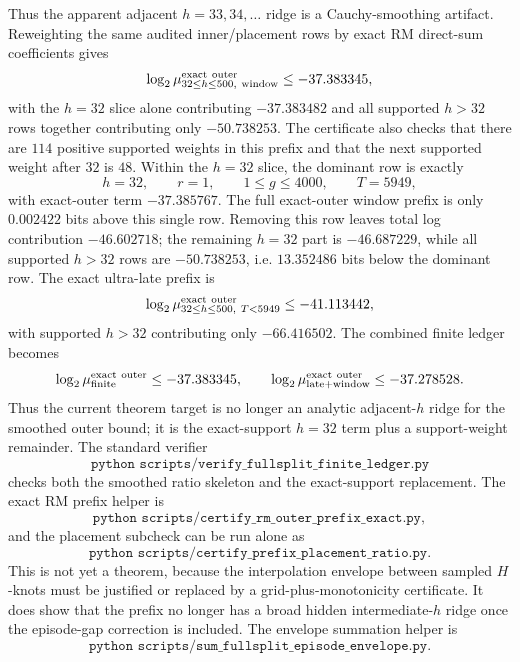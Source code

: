 Thus the apparent adjacent \(h=33,34,\ldots\) ridge is a Cauchy-smoothing artifact.  Reweighting the same audited
inner/placement rows by exact RM direct-sum coefficients gives
\[
\log_2\mu_{32\le h\le500,\ {\rm window}}^{\rm exact\ outer}\le -37.383345,
\]
with the \(h=32\) slice alone contributing \(-37.383482\) and all supported \(h>32\) rows together contributing only
\(-50.738253\).  The certificate also checks that there are \(114\) positive supported weights in this prefix and that
the next supported weight after \(32\) is \(48\).
Within the \(h=32\) slice, the dominant row is exactly
\[
h=32,\qquad r=1,\qquad 1\le g\le4000,\qquad T=5949,
\]
with exact-outer term \(-37.385767\).  The full exact-outer window prefix is only \(0.002422\) bits above this
single row.  Removing this row leaves total log contribution \(-46.602718\); the remaining \(h=32\) part is
\(-46.687229\), while all supported \(h>32\) rows are \(-50.738253\), i.e. \(13.352486\) bits below the dominant row.
The exact ultra-late prefix is
\[
\log_2\mu_{32\le h\le500,\ T<5949}^{\rm exact\ outer}\le -41.113442,
\]
with supported \(h>32\) contributing only \(-66.416502\).
The combined finite ledger becomes
\[
\log_2\mu_{\rm finite}^{\rm exact\ outer}\le -37.383345,\qquad
\log_2\mu_{\rm late+window}^{\rm exact\ outer}\le -37.278528.
\]
Thus the current theorem target is no longer an analytic adjacent-\(h\) ridge for the smoothed outer bound; it is the
exact-support \(h=32\) term plus a support-weight remainder.
The standard verifier
\[
\texttt{python scripts/verify\_fullsplit\_finite\_ledger.py}
\]
checks both the smoothed ratio skeleton and the exact-support replacement.  The exact RM prefix helper is
\[
\texttt{python scripts/certify\_rm\_outer\_prefix\_exact.py},
\]
and the placement subcheck can be run alone as
\[
\texttt{python scripts/certify\_prefix\_placement\_ratio.py}.
\]
This is not yet a theorem, because the interpolation envelope between sampled \(H\)-knots must be justified or replaced
by a grid-plus-monotonicity certificate.  It does show that the prefix no longer has a broad hidden intermediate-\(h\)
ridge once the episode-gap correction is included.  The envelope summation helper is
\[
\texttt{python scripts/sum\_fullsplit\_episode\_envelope.py}.
\]


